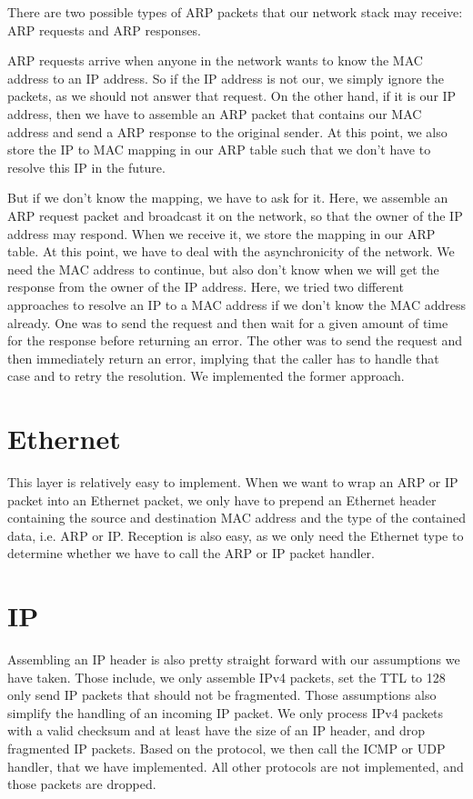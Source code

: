 There are two possible types of ARP packets that our network stack may receive:
ARP requests and ARP responses. 

ARP requests arrive when anyone in the network wants to know the MAC address to
an IP address. So if the IP address is not our, we simply ignore the packets, as
we should not answer that request. On the other hand, if it is our IP address,
then we have to assemble an ARP packet that contains our MAC address and send a
ARP response to the original sender. At this point, we also store the IP to MAC
mapping in our ARP table such that we don't have to resolve this IP in the
future.

But if we don't know the mapping, we have to ask for it. Here, we assemble an
ARP request packet and broadcast it on the network, so that the owner of the IP
address may respond. When we receive it, we store the mapping in our ARP table.
At this point, we have to deal with the asynchronicity of the network. We need
the MAC address to continue, but also don't know when we will get the response
from the owner of the IP address.  Here, we tried two different approaches to
resolve an IP to a MAC address if we don't know the MAC address already. One was
to send the request and then wait for a given amount of time for the response
before returning an error. The other was to send the request and then
immediately return an error, implying that the caller has to handle that case
and to retry the resolution. We implemented the former approach.

\section{Ethernet}

This layer is relatively easy to implement. When we want to wrap an ARP or IP
packet into an Ethernet packet, we only have to prepend an Ethernet header
containing the source and destination MAC address and the type of the contained
data, i.e. ARP or IP.  Reception is also easy, as we only need the Ethernet type
to determine whether we have to call the ARP or IP packet handler.

\section{IP}

Assembling an IP header is also pretty straight forward with our assumptions we
have taken. Those include, we only assemble IPv4 packets, set the TTL to 128
only send IP packets that should not be fragmented.  Those assumptions also
simplify the handling of an incoming IP packet. We only process IPv4 packets
with a valid checksum and at least have the size of an IP header, and drop
fragmented IP packets. Based on the protocol, we then call the ICMP or UDP
handler, that we have implemented. All other protocols are not implemented, and
those packets are dropped.

